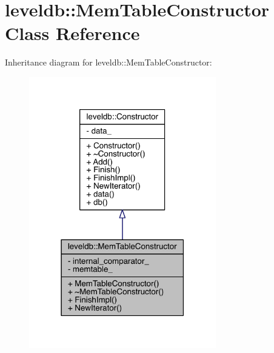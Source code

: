 \hypertarget{classleveldb_1_1_mem_table_constructor}{}\section{leveldb\+:\+:Mem\+Table\+Constructor Class Reference}
\label{classleveldb_1_1_mem_table_constructor}


Inheritance diagram for leveldb\+:\+:Mem\+Table\+Constructor\+:\nopagebreak
\begin{figure}[H]
\begin{center}
\leavevmode
\includegraphics[width=231pt]{classleveldb_1_1_mem_table_constructor__inherit__graph}
\end{center}
\end{figure}


